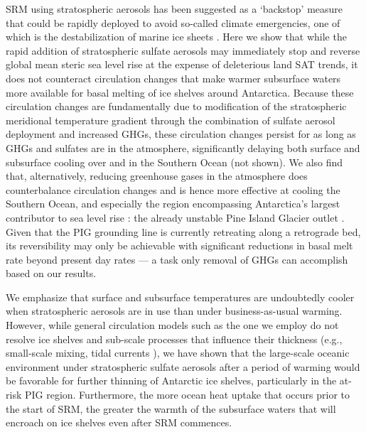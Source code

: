 \documentclass{nature}
\begin{document}
SRM using stratospheric aerosols has been suggested as a `backstop' measure that could be rapidly deployed to avoid so-called climate emergencies, one of which is the destabilization of marine ice sheets \cite{blackstock09}. Here we show that while the rapid addition of stratospheric sulfate aerosols may immediately stop and reverse global mean steric sea level rise at the expense of deleterious land SAT trends, it does not counteract circulation changes that make warmer subsurface waters more available for basal melting of ice shelves around Antarctica. Because these circulation changes are fundamentally due to modification of the stratospheric meridional temperature gradient through the combination of sulfate aerosol deployment and increased GHGs, these circulation changes persist for as long as GHGs and sulfates are in the atmosphere, significantly delaying both surface and subsurface cooling over and in the Southern Ocean (not shown). We also find that, alternatively, reducing greenhouse gases in the atmosphere does counterbalance circulation changes and is hence more effective at cooling the Southern Ocean, and especially the region encompassing Antarctica's largest contributor to sea level rise \cite{shepherd12}: the already unstable Pine Island Glacier outlet \cite{rignot14}. Given that the PIG grounding line is currently retreating along a retrograde bed, its reversibility may only be achievable with significant reductions in basal melt rate beyond present day rates \cite{favier14} --- a task only removal of GHGs can accomplish based on our results. 

We emphasize that surface and subsurface temperatures are undoubtedly cooler when stratospheric aerosols are in use than under business-as-usual warming. However, while general circulation models such as the one we employ do not resolve ice shelves and sub-scale processes that influence their thickness (e.g., small-scale mixing, tidal currents \cite{joughin11}), we have shown that the large-scale oceanic environment under stratospheric sulfate aerosols after a period of warming would be favorable for further thinning of Antarctic ice shelves, particularly in the at-risk PIG region. Furthermore, the more ocean heat uptake that occurs prior to the start of SRM, the greater the warmth of the subsurface waters that will encroach on ice shelves even after SRM commences. 
\end{document}
